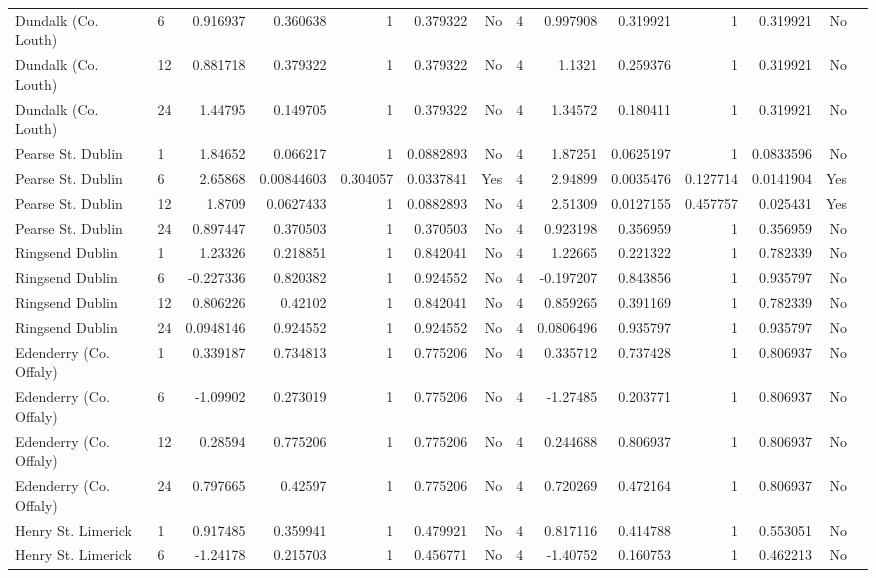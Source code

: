 \begin{table}[p]
{\begin{tabular}{llrrrrrrrrrrrr}
Dundalk (Co. Louth) & 6 & 0.916937 & 0.360638 & 1 & 0.379322 & No & 4 & 0.997908 & 0.319921 & 1 & 0.319921 & No \\
Dundalk (Co. Louth) & 12 & 0.881718 & 0.379322 & 1 & 0.379322 & No & 4 & 1.1321 & 0.259376 & 1 & 0.319921 & No \\
Dundalk (Co. Louth) & 24 & 1.44795 & 0.149705 & 1 & 0.379322 & No & 4 & 1.34572 & 0.180411 & 1 & 0.319921 & No \\
Pearse St. Dublin & 1 & 1.84652 & 0.066217 & 1 & 0.0882893 & No & 4 & 1.87251 & 0.0625197 & 1 & 0.0833596 & No \\
Pearse St. Dublin & 6 & 2.65868 & 0.00844603 & 0.304057 & 0.0337841 & Yes & 4 & 2.94899 & 0.0035476 & 0.127714 & 0.0141904 & Yes \\
Pearse St. Dublin & 12 & 1.8709 & 0.0627433 & 1 & 0.0882893 & No & 4 & 2.51309 & 0.0127155 & 0.457757 & 0.025431 & Yes \\
Pearse St. Dublin & 24 & 0.897447 & 0.370503 & 1 & 0.370503 & No & 4 & 0.923198 & 0.356959 & 1 & 0.356959 & No \\
Ringsend Dublin & 1 & 1.23326 & 0.218851 & 1 & 0.842041 & No & 4 & 1.22665 & 0.221322 & 1 & 0.782339 & No \\
Ringsend Dublin & 6 & -0.227336 & 0.820382 & 1 & 0.924552 & No & 4 & -0.197207 & 0.843856 & 1 & 0.935797 & No \\
Ringsend Dublin & 12 & 0.806226 & 0.42102 & 1 & 0.842041 & No & 4 & 0.859265 & 0.391169 & 1 & 0.782339 & No \\
Ringsend Dublin & 24 & 0.0948146 & 0.924552 & 1 & 0.924552 & No & 4 & 0.0806496 & 0.935797 & 1 & 0.935797 & No \\
Edenderry (Co. Offaly) & 1 & 0.339187 & 0.734813 & 1 & 0.775206 & No & 4 & 0.335712 & 0.737428 & 1 & 0.806937 & No \\
Edenderry (Co. Offaly) & 6 & -1.09902 & 0.273019 & 1 & 0.775206 & No & 4 & -1.27485 & 0.203771 & 1 & 0.806937 & No \\
Edenderry (Co. Offaly) & 12 & 0.28594 & 0.775206 & 1 & 0.775206 & No & 4 & 0.244688 & 0.806937 & 1 & 0.806937 & No \\
Edenderry (Co. Offaly) & 24 & 0.797665 & 0.42597 & 1 & 0.775206 & No & 4 & 0.720269 & 0.472164 & 1 & 0.806937 & No \\
Henry St. Limerick & 1 & 0.917485 & 0.359941 & 1 & 0.479921 & No & 4 & 0.817116 & 0.414788 & 1 & 0.553051 & No \\
Henry St. Limerick & 6 & -1.24178 & 0.215703 & 1 & 0.456771 & No & 4 & -1.40752 & 0.160753 & 1 & 0.462213 & No \\

\end{tabular}}
\end{table}
